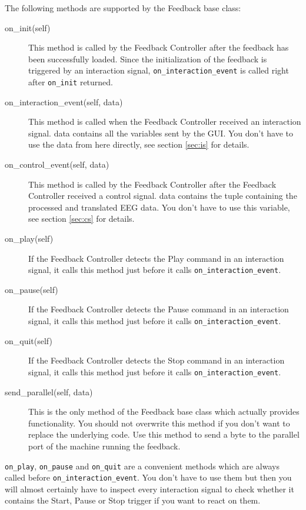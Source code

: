 The following methods are supported by the Feedback base class:
\begin{description}
\item[on\_init(self)] This method is called by the Feedback Controller after the feedback has been successfully loaded. Since the initialization of the feedback is triggered by an interaction signal, \lstinline+on_interaction_event+ is called right after \lstinline+on_init+ returned.
\item[on\_interaction\_event(self, data)] This method is called when the Feedback Controller received an interaction signal. data contains all the variables sent by the GUI. You don't have to use the data from here directly, see section \ref{sec:is} for details.
\item[on\_control\_event(self, data)] This method is called by the Feedback Controller after the Feedback Controller received a control signal. data contains the tuple containing the processed and translated EEG data. You don't have to use this variable, see section \ref{sec:cs} for details.
\item[on\_play(self)] If the Feedback Controller detects the Play command in an interaction signal, it calls this method just before it calls \lstinline+on_interaction_event+.
\item[on\_pause(self)] If the Feedback Controller detects the Pause command in an interaction signal, it calls this method just before it calls \lstinline+on_interaction_event+.
\item[on\_quit(self)] If the Feedback Controller detects the Stop command in an interaction signal, it calls this method just before it calls \lstinline+on_interaction_event+.
\item[send\_parallel(self, data)] This is the only method of the Feedback base class which actually provides functionality. You should not overwrite this method if you don't want to replace the underlying code. Use this method to send a byte to the parallel port of the machine running the feedback.
\end{description}
\lstinline+on_play+, \lstinline+on_pause+ and \lstinline+on_quit+ are a convenient methods which are always called before \lstinline+on_interaction_event+. You don't have to use them but then you will almost certainly have to inspect every interaction signal to check whether it contains the Start, Pause or Stop trigger if you want to react on them.

